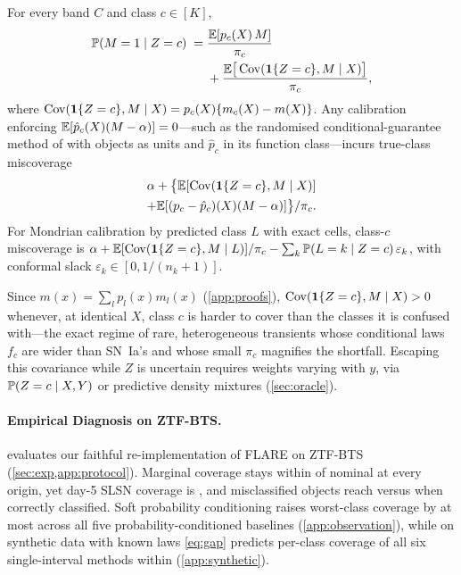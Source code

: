 \begin{proposition}
\label{prop:gap}
For every band $C$ and class $c\in[K]$,
\begin{equation}
\label{eq:gap}
\begin{split}
\P(M=1\mid Z=c) \;=\;& \frac{\E[p_c(X)\,M]}{\pi_c}\\
&+ \frac{\E\big[\Cov(\one\{Z=c\},M\mid X)\big]}{\pi_c},
\end{split}
\end{equation}
where $\Cov(\one\{Z=c\},M\mid X)=p_c(X)\{m_c(X)-m(X)\}$.
Any calibration enforcing $\E[\hat p_c(X)(M-\alpha)]=0$---such as the randomised conditional-guarantee method of \citet{gibbs2025conformal} with objects as units and $\hat p_c$ in its function class---incurs true-class miscoverage
\begin{multline*}
\alpha+\big\{\E[\Cov(\one\{Z=c\},M\mid X)]\\
+\E[(p_c-\hat p_c)(X)(M-\alpha)]\big\}/\pi_c .
\end{multline*}
For Mondrian calibration by predicted class $L$ with exact cells, class-$c$ miscoverage is $\alpha+\E[\Cov(\one\{Z=c\},M\mid L)]/\pi_c-\sum_k\P(L=k\mid Z=c)\,\varepsilon_k$, with conformal slack $\varepsilon_k\in[0,1/(n_k+1)]$.
\end{proposition}

Since $m(x)=\sum_l p_l(x)m_l(x)$ (\cref{app:proofs}), $\Cov(\one\{Z=c\},M\mid X)>0$ whenever, at identical $X$, class $c$ is harder to cover than the classes it is confused with---the exact regime of rare, heterogeneous transients whose conditional laws $f_c$ are wider than SN~Ia's and whose small $\pi_c$ magnifies the shortfall.
Escaping this covariance while $Z$ is uncertain requires weights varying with $y$, via $\P(Z=c\mid X,Y)$ \citep{bairaktari2025kandinsky} or predictive density mixtures (\cref{sec:oracle}).

\paragraph{Empirical Diagnosis on ZTF-BTS.}
\label{sec:observation}
 evaluates our faithful re-implementation of FLARE on ZTF-BTS (\cref{sec:exp,app:protocol}).
Marginal coverage stays within \ZTFflareMargDev{} of nominal at every origin, yet day-5 SLSN coverage is \ZTFflareSLSNsixtyeight{}, and misclassified objects reach \ZTFflareMisclsSixtyeight{} versus \ZTFflareCorrectSixtyeight{} when correctly classified.
Soft probability conditioning raises worst-class coverage by at most \ZTFprobGainMax{} across all five probability-conditioned baselines (\cref{app:observation}), while on synthetic data with known laws \cref{eq:gap} predicts per-class coverage of all six single-interval methods within \SynPropGapErr{} (\cref{app:synthetic}).

